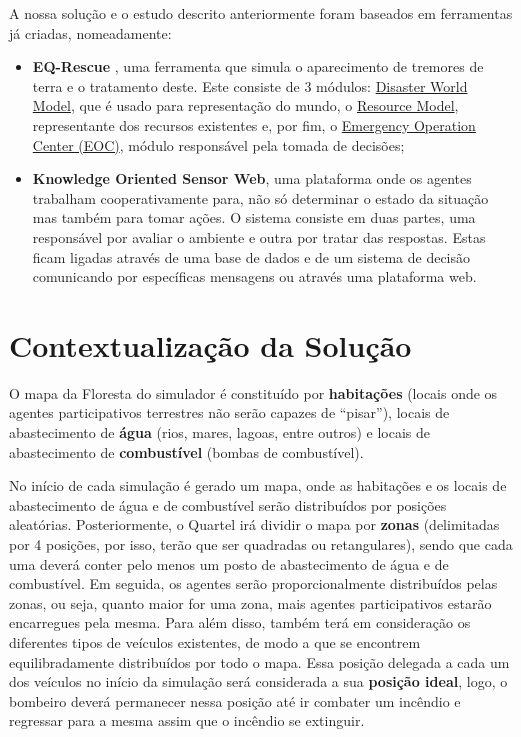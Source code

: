 \documentclass[a4paper]{article}
\begin{document}
A nossa solução e o estudo descrito anteriormente foram baseados em ferramentas já criadas, nomeadamente:
\begin{itemize}
    \item \textbf{EQ-Rescue} \cite{eqr}, uma ferramenta que simula o aparecimento de tremores de terra e o tratamento deste. Este consiste de 3 módulos: \underline{Disaster World Model}, que é usado para representação do mundo, o \underline{Resource Model}, representante dos recursos existentes e, por fim, o \underline{Emergency Operation Center (EOC)}, módulo responsável pela tomada de decisões;
    \item\textbf{ Knowledge Oriented Sensor Web}\cite{kos}, uma plataforma onde os agentes trabalham cooperativamente para, não só determinar o estado da situação mas também para tomar ações. O sistema consiste em duas partes, uma responsável por avaliar o ambiente e outra por tratar das respostas. Estas ficam ligadas através de uma base de dados e de um sistema de decisão comunicando por específicas mensagens ou através uma plataforma web.
\end{itemize}

\section{Contextualização da Solução}

O mapa da Floresta do simulador é constituído por \textbf{habitações} (locais onde os agentes participativos terrestres não serão capazes de “pisar”), locais de abastecimento de \textbf{água} (rios, mares, lagoas, entre outros) e locais de abastecimento de \textbf{combustível} (bombas de combustível).

No início de cada simulação é gerado um mapa, onde as habitações e os locais de abastecimento de água e de combustível serão distribuídos por posições aleatórias. Posteriormente, o Quartel irá dividir o mapa por \textbf{zonas} (delimitadas por 4 posições, por isso, terão que ser quadradas ou retangulares), sendo que cada uma deverá conter pelo menos um posto de abastecimento de água e de combustível. Em seguida, os agentes serão proporcionalmente distribuídos pelas zonas, ou seja, quanto maior for uma zona, mais agentes participativos estarão encarregues pela mesma. Para além disso, também terá em consideração os diferentes tipos de veículos existentes, de modo a que se encontrem equilibradamente distribuídos por todo o mapa. Essa posição delegada a cada um dos veículos no início da simulação será considerada a sua \textbf{posição ideal}, logo, o bombeiro deverá permanecer nessa posição até ir combater um incêndio e regressar para a mesma assim que o incêndio se extinguir.
\end{document}
